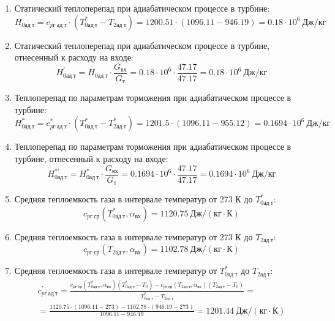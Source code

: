 \documentclass[a4paper,12pt]{article}
\begin{document}
\begin{enumerate}
        \item Статический теплоперепад при адиабатическом процессе в турбине:
        \[
            H_{0ад\ т} = c_{pг\ ад\ т} \cdot \left(
            T_{0ад\ т}^* - T_{2ад\ т}
            \right) =
            1200.51 \cdot \left(
            1096.11 - 946.19
            \right) =
            0.18 \cdot 10^6 \ Дж/кг
        \]

        \item Статический теплоперепад при адиабатическом процессе в турбине, отнесенный к расходу на входе:
        \[
            H_{0ад\ т}^\prime = H_{0ад\ т} \cdot \frac{ G_{вх} }{ G_т }  =
                0.18 \cdot 10^6 \cdot
                \frac{ 47.17 }{ 47.17 } =
            0.18 \cdot 10^6 \ Дж/кг
        \]

        \item Теплоперепад по параметрам торможения при адиабатическом процессе в турбине:
        \[
            H_{0ад\ т}^* = c_{pг\ ад\ т}^* \cdot \left(
            T_{0ад\ т}^* - T_{2ад\ т}^*
            \right) =
            1201.5 \cdot \left(
            1096.11 - 955.12
            \right) =
            0.1694 \cdot 10^6 \ Дж/кг
        \]

        \item Теплоперепад по параметрам торможения при адиабатическом процессе в турбине, отнесенный к расходу на входе:
        \[
            H_{0ад\ т}^{*\prime} = H_{0ад\ т}^* \cdot \frac{ G_{вх} }{ G_т }  =
                0.1694 \cdot 10^6 \cdot
                \frac{ 47.17 }{ 47.17 } =
            0.1694 \cdot 10^6 \ Дж/кг
        \]

        \item Средняя теплоемкость газа в интервале температур от 273 К до $T_{0ад\ т}^*$:
        \[
            c_{pг\ ср} (T_{0ад\ т}^*, \alpha_{вх}) =
            1120.75 \ Дж/(кг \cdot К)
        \]

        \item Средняя теплоемкость газа в интервале температур от 273 К до $T_{2ад\ т}$:
        \[
            c_{pг\ ср} (T_{2ад\ т}, \alpha_{вх}) =
            1102.78 \ Дж/(кг \cdot К)
        \]

        \item Средняя теплоемкость газа в интервале температур от $T_{0ад\ т}^*$ до $T_{2ад\ т}$:
        \begin{gather*}
            c_{pг\ ад\ т}^\prime = \frac{
		        c_{pг\ ср} (T_{0ад\ т}^*, \alpha_{вх}) (T_{0ад\ т}^* - T_0) - c_{pг\ ср} (T_{2ад\ т}, \alpha_{вх})(T_{2ад\ т} - T_0)
		    }{
		        T_{0ад\ т}^* - T_{2ад\ т}} =\\
            =\frac{
		        1120.75 \cdot
                (1096.11 - 273) -
		        1102.78 \cdot
                (946.19 - 273)
		    }{
		        1096.11 - 946.19} =
		    1201.44 \ Дж / (кг \cdot К)\\
        \end{gather*}


\end{enumerate}
\end{document}

